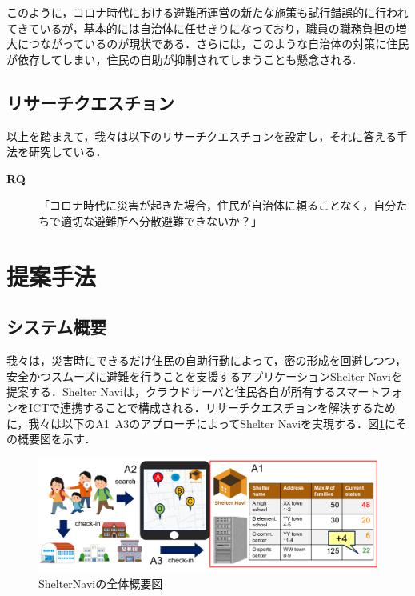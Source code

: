 \documentclass[technicalreport,dvipdfmx]{ieicej}
\begin{document}
このように，コロナ時代における避難所運営の新たな施策も試行錯誤的に行われてきているが，基本的には自治体に任せきりになっており，職員の職務負担の増大につながっているのが現状である．さらには，このような自治体の対策に住民が依存してしまい，住民の自助が抑制されてしまうことも懸念される. 

\subsection{リサーチクエスチョン}
以上を踏まえて，我々は以下のリサーチクエスチョンを設定し，それに答える手法を研究している．
\\
\begin{description}
     \item[\textbf{RQ}]「コロナ時代に災害が起きた場合，住民が自治体に頼ることなく，自分たちで適切な避難所へ分散避難できないか？」
\end{description}

\section{提案手法}
\subsection{システム概要}
我々は，災害時にできるだけ住民の自助行動によって，密の形成を回避しつつ，安全かつスムーズに避難を行うことを支援するアプリケーションShelter Naviを提案する．Shelter Naviは，クラウドサーバと住民各自が所有するスマートフォンをICTで連携することで構成される．リサーチクエスチョンを解決するために，我々は以下のA1~A3のアプローチによってShelter Naviを実現する．図\ref{fig:system}にその概要図を示す．

\begin{figure}[t]
     \begin{center}
          \includegraphics[scale=0.6,pagebox=cropbox,clip]{img/system.png}
          \caption{ShelterNaviの全体概要図}
          \label{fig:system}
     \end{center}
\end{figure}
\end{document}
